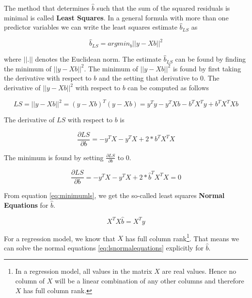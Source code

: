 \documentclass[]{book}
\theoremstyle{definition}
\theoremstyle{definition}
\theoremstyle{definition}
\theoremstyle{remark}
\begin{document}
The method that determines \(\hat{b}\) such that the sum of the squared residuals is minimal is called \textbf{Least Squares}. In a general formula with more than one predictor variables we can write the least squares estimate \(\hat{b}_{LS}\) as

\begin{equation}
  \hat{b}_{LS} = argmin_b ||y - Xb||^2
  \label{eq:leastsquaresestimate}
\end{equation}

where \(||.||\) denotes the Euclidean norm. The estimate \(\hat{b}_{LS}\) can be found by finding the minimum of \(||y - Xb||^2\). The minimum of \(||y - Xb||^2\) is found by first taking the derivative with respect to \(b\) and the setting that derivative to \(0\). The derivative of \(||y - Xb||^2\) with respect to \(b\) can be computed as follows

\begin{equation}
  LS = ||y - Xb||^2 = (y - Xb)^T(y - Xb) = y^Ty - y^TXb - b^TX^Ty + b^TX^TXb
  \label{eq:computels}
\end{equation}

The derivative of \(LS\) with respect to \(b\) is

\begin{equation}
  \frac{\partial LS}{\partial b} = -y^TX - y^TX + 2*b^TX^TX
  \label{eq:partiallswrtb}
\end{equation}

The minimum is found by setting \(\frac{\partial LS}{\partial b}\) to \(0\).

\begin{equation}
  \frac{\partial LS}{\partial b} = -y^TX - y^TX + 2*\hat{b}^TX^TX = 0
  \label{eq:minimumls}
\end{equation}

From equation \eqref{eq:minimumls}, we get the so-called least squares \textbf{Normal Equations} for \(\hat{b}\).

\begin{equation}
   X^TX\hat{b} = X^Ty
  \label{eq:lsnormalequations}
\end{equation}

For a regression model, we know that \(X\) has full column rank\footnote{In a regression model, all values in the matrix \(X\) are real values. Hence no column of \(X\) will be a linear combination of any other columns and therefore \(X\) has full column rank.}. That means we can solve the normal equations \eqref{eq:lsnormalequations} explicitly for \(\hat{b}\).
\end{document}
